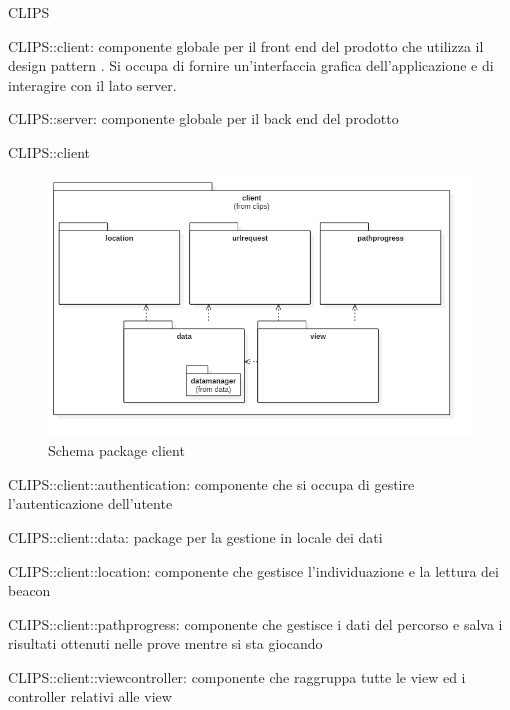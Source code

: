 \begin{componente}{CLIPS}
\begin{compPackageContenuti}
\item CLIPS::client: componente globale per il front end del prodotto che utilizza il design pattern . Si occupa di fornire un'interfaccia grafica dell'applicazione e di interagire con il lato server.
\item CLIPS::server: componente globale per il back end del prodotto
\end{compPackageContenuti}
\end{componente}
\begin{componente}{CLIPS::client}
\begin{figure}[h!]
\centering
\includegraphics[scale=0.5]{img/package/png/client.png}
\caption{Schema package client}
 \end{figure}
\begin{compPackageContenuti}
\item CLIPS::client::authentication: componente che si occupa di gestire l'autenticazione dell'utente
\item CLIPS::client::data: package per la gestione in locale dei dati
\item CLIPS::client::location: componente che gestisce l'individuazione e la lettura dei beacon
\item CLIPS::client::pathprogress: componente che gestisce i dati del percorso e salva i risultati ottenuti nelle prove mentre si sta giocando
\item CLIPS::client::viewcontroller: componente che raggruppa tutte le view ed i controller relativi alle view
\end{compPackageContenuti}
\end{componente}

